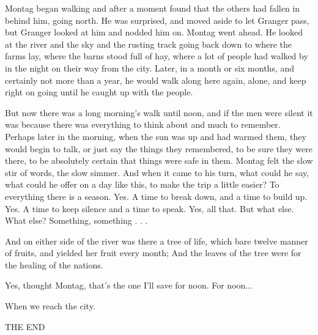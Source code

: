 \documentclass[11pt,openany]{book}
\begin{document}
Montag began walking and after a moment found that the others had fallen in behind him, going north. He was surprised, and moved aside to let Granger pass, but Granger looked at him and nodded him on. Montag went ahead. He looked at the river and the sky and the rusting track going back down to where the farms lay, where the barns stood full of hay, where a lot of people had walked by in the night on their way from the city. Later, in a month or six months, and certainly not more than a year, he would walk along here again, alone, and keep right on going until he caught up with the people.

But now there was a long morning's walk until noon, and if the men were silent it was because there was everything to think about and much to remember. Perhaps later in the morning, when the sun was up and had warmed them, they would begin to talk, or just say the things they remembered, to be sure they were there, to be absolutely certain that things were safe in them. Montag felt the slow stir of words, the slow simmer. And when it came to his turn, what could he say, what could he offer on a day like this, to make the trip a little easier? To everything there is a season. Yes. A time to break down, and a time to build up. Yes. A time to keep silence and a time to speak. Yes, all that. But what else. What else? Something, something . . .

And on either side of the river was there a tree of life, which bare twelve manner of fruits, and yielded her fruit every month; And the leaves of the tree were for the healing of the nations.

Yes, thought Montag, that's the one I'll save for noon. For noon...

When we reach the city.

THE END
\end{document}
